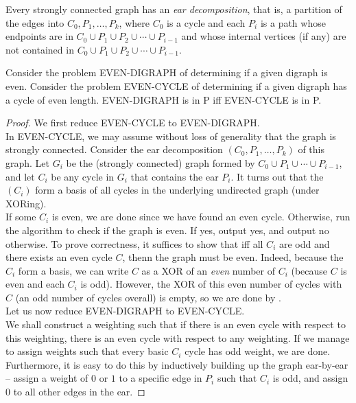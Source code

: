 
\begin{fprop}
	Every strongly connected graph has an \emph{ear decomposition}, that is, a partition of the edges into $C_0,P_1,\ldots,P_k$, where $C_0$ is a cycle and each $P_i$ is a path whose endpoints are in $C_0 \cup P_1 \cup P_2 \cup \cdots \cup P_{i-1}$ and whose internal vertices (if any) are not contained in $C_0 \cup P_1 \cup P_2 \cup \cdots \cup P_{i-1}$.
\end{fprop}

\begin{ftheo}
	Consider the problem EVEN-DIGRAPH of determining if a given digraph is even. Consider the problem EVEN-CYCLE of determining if a given digraph has a cycle of even length. EVEN-DIGRAPH is in \textsf{P} iff EVEN-CYCLE is in \textsf{P}.
\end{ftheo}
\begin{proof}
	We first reduce EVEN-CYCLE to EVEN-DIGRAPH.\\
	In EVEN-CYCLE, we may assume without loss of generality that the graph is strongly connected. Consider the ear decomposition $(C_0,P_1,\ldots,P_k)$ of this graph. Let $G_i$ be the (strongly connected) graph formed by $C_0 \cup P_1 \cup \cdots \cup P_{i-1}$, and let $C_i$ be any cycle in $G_i$ that contains the ear $P_i$. It turns out that the $(C_i)$ form a basis of all cycles in the underlying undirected graph (under XORing).\\
	If some $C_i$ is even, we are done since we have found an even cycle. Otherwise, run the algorithm to check if the graph is even. If yes, output yes, and output no otherwise. To prove correctness, it suffices to show that iff all $C_i$ are odd and there exists an even cycle $C$, thenn the graph must be even. Indeed, because the $C_i$ form a basis, we can write $C$ as a XOR of an \emph{even} number of $C_i$ (because $C$ is even and each $C_i$ is odd). However, the XOR of this even number of cycles with $C$ (an odd number of cycles overall) is empty, so we are done by .\\

	Let us now reduce EVEN-DIGRAPH to EVEN-CYCLE.\\
	We shall construct a weighting such that if there is an even cycle with respect to this weighting, there is an even cycle with respect to any weighting. If we manage to assign weights such that every basic $C_i$ cycle has odd weight, we are done. Furthermore, it is easy to do this by inductively building up the graph ear-by-ear -- assign a weight of $0$ or $1$ to a specific edge in $P_i$ such that $C_i$ is odd, and assign $0$ to all other edges in the ear.
\end{proof}

